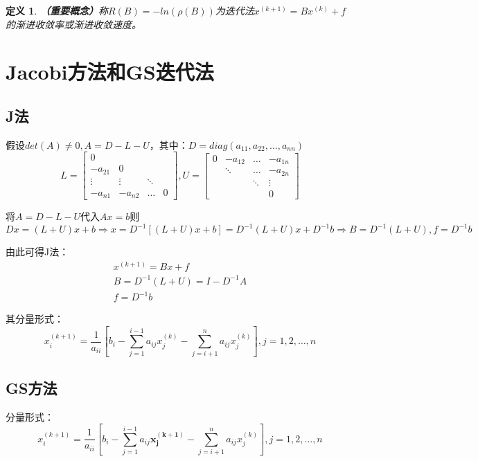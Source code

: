 \documentclass[a4paper]{article}
\newtheorem{definition}{定义}[section]
\begin{document}
\begin{definition}
  \textbf{（重要概念）}称$R(B)=-ln(\rho(B)) $为迭代法$x^{(k+1)}=Bx^{(k)}+f $的渐进收敛率或渐进收敛速度。
\end{definition}

\section{Jacobi方法和GS迭代法}
\subsection{J法}
假设$det(A)\neq 0,A=D-L-U$，其中：$D=diag(a_{11}, a_{22}, \dots, a_{nn})$
$$L=\left[
  \begin{matrix}
    0 \\
    -a_{21} & 0 \\
    \vdots & \vdots & \ddots \\
    -a_{n1} & -a_{n2} & \dots & 0
  \end{matrix}
  \right],
  U=\left[\begin{matrix}
    0 & -a_{12} & \dots & -a_{1n} \\
      &  \ddots & \dots & -a_{2n} \\
      & & \ddots & \vdots \\
      & & & 0
  \end{matrix}
    \right]
  $$

将$A=D-L-U$代入$Ax=b$则$Dx=(L+U)x+b\Rightarrow x=D^{-1}[(L+U)x+b]=D^{-1}(L+U)x+D^{-1}b \Rightarrow B=D^{-1}(L+U), f=D^{-1}b $

由此可得J法：
\begin{equation}
  \begin{array}{lr}
    x^{(k+1)} = Bx+f \\
    B = D^{-1}(L+U) = I-D^{-1}A \\
    f = D^{-1}b
  \end{array}
\end{equation}

其分量形式：
\begin{equation}
  x_i^{(k+1)} = \frac{1}{a_{ii}}[b_i-\sum_{j=1}^{i-1}a_{ij}x_j^{(k)}-\sum^n_{j=i+1}a_{ij}x^{(k)}_j],j=1,2,\dots, n
\end{equation}

\subsection{GS方法}
分量形式：
\begin{equation}
  x_i^{(k+1)} = \frac{1}{a_{ii}}[b_i-\sum_{j=1}^{i-1}a_{ij}\mathbf{x_j^{(k+1)}}-\sum^n_{j=i+1}a_{ij}x^{(k)}_j],j=1,2,\dots, n
\end{equation}
\end{document}
